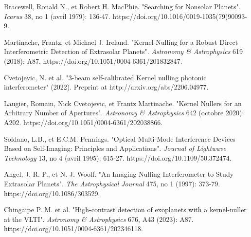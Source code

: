\documentclass[]{spie}  %
\begin{document}
\begin{thebibliography}{60}

     Bracewell, Ronald N., et Robert H. MacPhie. "Searching for Nonsolar Planets". {\it Icarus} 38, no 1 (avril 1979): 136‑47. https://doi.org/10.1016/0019-1035(79)90093-9.

      Martinache, Frantz, et Michael J. Ireland. "Kernel-Nulling for a Robust Direct Interferometric Detection of Extrasolar Planets". {\it Astronomy \& Astrophysics} 619 (2018): A87. https://doi.org/10.1051/0004-6361/201832847.
    
    
     Cvetojevic, N. et al. "3-beam self-calibrated Kernel nulling photonic interferometer" (2022). Preprint at http://arxiv.org/abs/2206.04977.

     Laugier, Romain, Nick Cvetojevic, et Frantz Martinache. "Kernel Nullers for an Arbitrary Number of Apertures". {\it Astronomy \& Astrophysics} 642 (octobre 2020): A202. https://doi.org/10.1051/0004-6361/202038866.

     Soldano, L.B., et E.C.M. Pennings. "Optical Multi-Mode Interference Devices Based on Self-Imaging: Principles and Applications". {\it Journal of Lightwave Technology} 13, no 4 (avril 1995): 615‑27. https://doi.org/10.1109/50.372474.

     Angel, J. R. P., et N. J. Woolf. "An Imaging Nulling Interferometer to Study Extrasolar Planets". {\it The Astrophysical Journal} 475, no 1 (1997): 373‑79. https://doi.org/10.1086/303529.

     Chingaipe P. M. et al. "High-contrast detection of exoplanets with a kernel-nuller at the VLTI". {\it Astronomy \& Astrophysics} 676, A43 (2023): A87. https://doi.org/10.1051/0004-6361/202346118.

\end{thebibliography}
\end{document}
